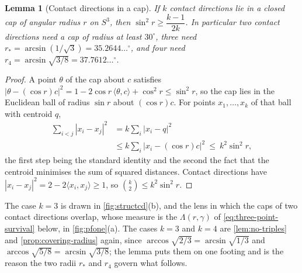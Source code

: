 \documentclass[11pt,reqno]{amsart}
\renewcommand{\_}{\origunderscore\allowbreak}
\numberwithin{equation}{section}
\theoremstyle{plain}
\newtheorem{lem}[thm]{Lemma}
\theoremstyle{definition}
\theoremstyle{remark}
\begin{document}
\begin{lem}[Contact directions in a cap]\label{lem:cap-count}
If $k$ contact directions lie in a closed cap of angular radius $r$ on
$S^3$, then $\sin^2r\ge\dfrac{k-1}{2k}$. In particular two contact
directions need a cap of radius at least $30^\circ$, three need
$r_*=\arcsin(1/\sqrt3)=35.2644\ldots^\circ$, and four need
$r_4=\arcsin\sqrt{3/8}=37.7612\ldots^\circ$.
\end{lem}

\begin{proof}
A point $\theta$ of the cap about $c$ satisfies
$|\theta-(\cos r)c|^2=1-2\cos r\,\langle\theta,c\rangle+\cos^2r\le\sin^2r$,
so the cap lies in the Euclidean ball of radius $\sin r$ about
$(\cos r)c$. For points $x_1,\dots,x_k$ of that ball with centroid $q$,
\[
\begin{aligned}
  \sum_{i<j}|x_i-x_j|^2 &= k\sum_i|x_i-q|^2\\
  &\le k\sum_i|x_i-(\cos r)c|^2\ \le\ k^2\sin^2r ,
\end{aligned}
\]
the first step being the standard identity and the second the fact
that the centroid minimises the sum of squared distances. Contact
directions have $|x_i-x_j|^2=2-2\langle x_i,x_j\rangle\ge1$, so
$\binom k2\le k^2\sin^2r$.
\end{proof}

The case $k=3$ is drawn in \cref{fig:structcd}(b), and the
lens in which the caps of two contact directions overlap, whose measure
is the $\Lambda(r,\gamma)$ of \eqref{eq:three-point-survival} below, in
\cref{fig:pfone}(a). The cases $k=3$ and $k=4$ are \cref{lem:no-triples} and
\cref{prop:covering-radius} again, since
$\arccos\sqrt{2/3}=\arcsin\sqrt{1/3}$ and
$\arccos\sqrt{5/8}=\arcsin\sqrt{3/8}$; the lemma puts them on one
footing and is the reason the two radii $r_*$ and $r_4$ govern what
follows.
\end{document}
